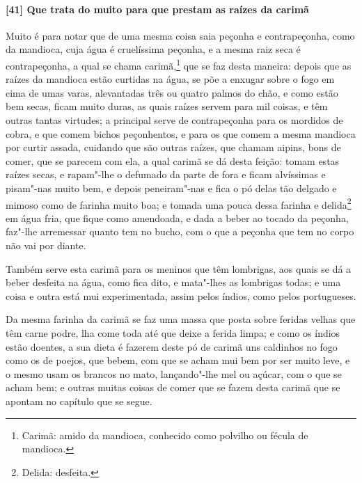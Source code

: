 \paragraph{[41] Que trata do muito para que prestam as raízes da carimã}\quad
Muito é para notar que de uma mesma coisa saia peçonha e contrapeçonha, como da mandioca,
cuja água é cruelíssima peçonha, e a mesma raiz seca é contrapeçonha, a qual se chama
carimã,\footnote{ Carimã: amido da mandioca, conhecido como polvilho ou fécula de
mandioca.} que se faz desta maneira: depois que as raízes da mandioca estão curtidas na
água, se põe a enxugar sobre o fogo em cima de umas varas, alevantadas três ou quatro
palmos do chão, e como estão bem secas, ficam muito duras, as quais raízes servem para mil
coisas, e têm outras tantas virtudes; a principal serve de contrapeçonha para os mordidos
de cobra, e que comem bichos peçonhentos, e para os que comem a mesma mandioca por curtir
assada, cuidando que são outras raízes, que chamam aipins, bons de comer, que se parecem
com ela, a qual carimã se dá desta feição: tomam estas raízes secas, e rapam"-lhe o
defumado da parte de fora e ficam alvíssimas e pisam"-nas muito bem, e depois peneiram"-nas
e fica o pó delas tão delgado e mimoso como de farinha muito boa; e tomada uma pouca dessa
farinha e delida\footnote{ Delida: desfeita.} em água fria, que fique como 
amendoada, e dada a beber ao tocado da peçonha, faz"-lhe arremessar quanto tem no bucho,
com o que a peçonha que tem no corpo não vai por diante.

Também serve esta carimã para os meninos que têm lombrigas, aos quais se dá a beber
desfeita na água, como fica dito, e mata"-lhes as lombrigas todas; e uma coisa e outra está
mui experimentada, assim pelos índios, como pelos portugueses.

Da mesma farinha da carimã se faz uma massa que posta sobre feridas velhas que têm carne
podre, lha come toda até que deixe a ferida limpa; e como os índios estão doentes, a sua
dieta é fazerem deste pó de carimã uns caldinhos no fogo como os de poejos, que bebem, com
que se acham mui bem por ser muito leve, e o mesmo usam os brancos no mato, lançando"-lhe
mel ou açúcar, com o que se acham bem; e outras muitas coisas de comer que se fazem desta
carimã que se apontam no capítulo que se segue.

